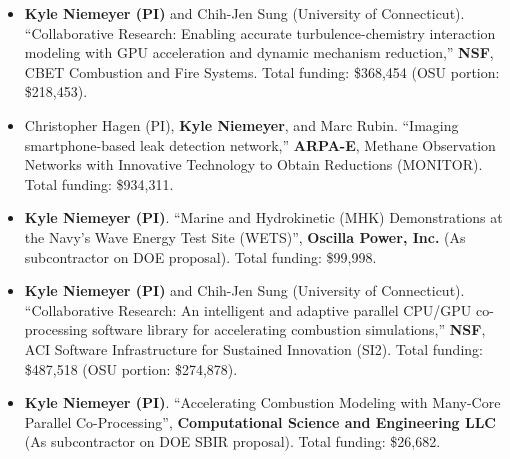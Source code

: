 \documentclass[margin,line,11pt]{res}
\begin{document}
\begin{resume}
\begin{itemize}[leftmargin=*]
\item \textbf{Kyle Niemeyer (PI)} and Chih-Jen Sung (University of Connecticut).
``Collaborative Research: Enabling accurate turbulence-chemistry interaction modeling with GPU acceleration and dynamic mechanism reduction,''
\textbf{NSF}, CBET Combustion and Fire Systems.
Total funding: \$368,454 (OSU portion: \$218,453).

\item Christopher Hagen (PI), \textbf{Kyle Niemeyer}, and Marc Rubin.
``Imaging smartphone-based leak detection network,''
\textbf{ARPA-E}, Methane Observation Networks with Innovative Technology to Obtain Reductions (MONITOR).
Total funding: \$934,311.

\item \textbf{Kyle Niemeyer (PI)}.
``Marine and Hydrokinetic (MHK) Demonstrations at the Navy's Wave Energy Test Site (WETS)'',
\textbf{Oscilla Power, Inc.} (As subcontractor on DOE proposal).
Total funding: \$99,998.

\item \textbf{Kyle Niemeyer (PI)} and Chih-Jen Sung (University of Connecticut).
``Collaborative Research: An intelligent and adaptive parallel CPU\slash GPU co-processing software library for accelerating combustion simulations,''
\textbf{NSF}, ACI Software Infrastructure for Sustained Innovation (SI2).
Total funding: \$487,518 (OSU portion: \$274,878).

\item \textbf{Kyle Niemeyer (PI)}.
``Accelerating Combustion Modeling with Many-Core Parallel Co-Pro\-cessing'',
\textbf{Computational Science and Engineering LLC} (As subcontractor on DOE SBIR proposal).
Total funding: \$26,682.

\end{itemize}

\end{resume}
\end{document}
